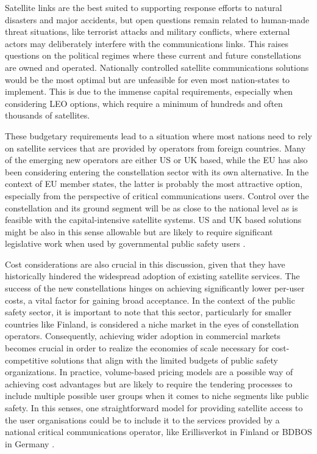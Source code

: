 \documentclass[english, 12pt, a4paper, elec, utf8, a-1b, online]{aaltothesis}
\begin{document}
Satellite links are the best suited to supporting response efforts to natural disasters and major accidents, but open questions remain related to human-made threat situations, like terrorist attacks and military conflicts, where external actors may deliberately interfere with the communications links.
This raises questions on the political regimes where these current and future constellations are owned and operated. Nationally controlled satellite communications solutions would be the most optimal but are unfeasible for even most nation-states to implement. This is due to the immense capital requirements, especially when considering LEO options, which require a minimum of hundreds and often thousands of satellites.

These budgetary requirements lead to a situation where most nations need to rely on satellite services that are provided by operators from foreign countries.
Many of the emerging new operators are either US or UK based, while the EU has also been considering entering the constellation sector with its own alternative.
In the context of EU member states, the latter is probably the most attractive option, especially from the perspective of critical communications users.
Control over the constellation and its ground segment will be as close to the national level as is feasible with the capital-intensive satellite systems.
US and UK based solutions might be also in this sense allowable but are likely to require significant legislative work when used by governmental public safety users \cite{snellman2022european}.

Cost considerations are also crucial in this discussion, given that they have historically hindered the widespread adoption of existing satellite services.
The success of the new constellations hinges on achieving significantly lower per-user costs, a vital factor for gaining broad acceptance.
In the context of the public safety sector, it is important to note that this sector, particularly for smaller countries like Finland, is considered a niche market in the eyes of constellation operators.
Consequently, achieving wider adoption in commercial markets becomes crucial in order to realize the economies of scale necessary for cost-competitive solutions that align with the limited budgets of public safety organizations.
In practice, volume-based pricing models are a possible way of achieving cost advantages but are likely to require the tendering processes to include multiple possible user groups when it comes to niche segments like public safety.
In this senses, one straightforward model for providing satellite access to the user organisations could be to include it to the services provided by a national critical communications operator, like Erillisverkot in Finland or BDBOS in Germany \cite{saynevirta2021satellite}.
\end{document}
